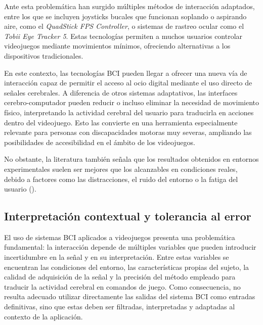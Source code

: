 Ante esta problemática han surgido múltiples métodos de interacción adaptados, entre los que se incluyen joysticks bucales que funcionan soplando o aspirando aire, como el \textit{QuadStick FPS Controller}, o sistemas de rastreo ocular como el \textit{Tobii Eye Tracker 5}. Estas tecnologías permiten a muchos usuarios controlar videojuegos mediante movimientos mínimos, ofreciendo alternativas a los dispositivos tradicionales.

En este contexto, las tecnologías BCI pueden llegar a ofrecer una nueva vía de interacción capaz de permitir el acceso al ocio digital mediante el uso directo de señales cerebrales. A diferencia de otros sistemas adaptativos, las interfaces cerebro-computador pueden reducir o incluso eliminar la necesidad de movimiento físico, interpretando la actividad cerebral del usuario para traducirla en acciones dentro del videojuego. Esto las convierte en una herramienta especialmente relevante para personas con discapacidades motoras muy severas, ampliando las posibilidades de accesibilidad en el ámbito de los videojuegos.

No obstante, la literatura también señala que los resultados obtenidos en entornos experimentales suelen ser mejores que los alcanzables en condiciones reales, debido a factores como las distracciones, el ruido del entorno o la fatiga del usuario (\cite{kerous2018eeg}).

\subsection{Interpretación contextual y tolerancia al error}
\label{subsec:interpretacionContextual}

El uso de sistemas BCI aplicados a videojuegos presenta una problemática fundamental: la interacción depende de múltiples variables que pueden introducir incertidumbre en la señal y en su interpretación. Entre estas variables se encuentran las condiciones del entorno, las características propias del sujeto, la calidad de adquisición de la señal y la precisión del método empleado para traducir la actividad cerebral en comandos de juego. Como consecuencia, no resulta adecuado utilizar directamente las salidas del sistema BCI como entradas definitivas, sino que estas deben ser filtradas, interpretadas y adaptadas al contexto de la aplicación.


